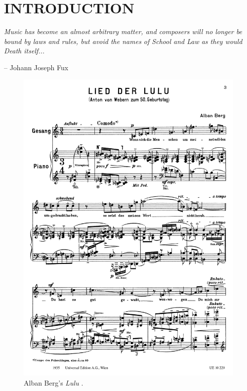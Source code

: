 
\chapter{INTRODUCTION}

\vspace{3em}
\setlength{\epigraphwidth}{0.86\textwidth}
\setlength{\epigraphrule}{0pt}
\epigraph{
	\textit{Music has become an almost arbitrary matter, and composers will no longer be bound by laws and rules, but avoid the names of School and Law as they would Death itself...}
}{\vspace{2em}-- Johann Joseph Fux}
\vspace{1em}

\begin{figure}[htbp]
    \centering
	\includegraphics[width=6.5in]{figures/berg1.pdf}
	\caption[Berg's \emph{Lulu}]{Alban Berg's \emph{Lulu} \cite[182]{Starr1984}.}
	\label{fig:berg-lulu}
\end{figure}

